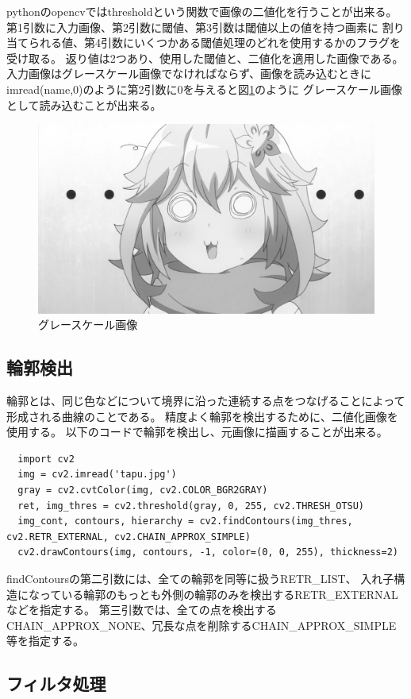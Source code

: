 \documentclass[dvipdfmx]{jsarticle}
\begin{document}
pythonのopencvではthresholdという関数で画像の二値化を行うことが出来る。
第1引数に入力画像、第2引数に閾値、第3引数は閾値以上の値を持つ画素に
割り当てられる値、第4引数にいくつかある閾値処理のどれを使用するかのフラグを受け取る。
返り値は2つあり、使用した閾値と、二値化を適用した画像である。
入力画像はグレースケール画像でなければならず、画像を読み込むときに
imread(name,0)のように第2引数に0を与えると図\ref{fig:grayscale}のように
グレースケール画像として読み込むことが出来る。
\begin{figure}[htbp]
  \centering
  \includegraphics[width=0.7\hsize]{../pic/grayscale.png}
  \caption{グレースケール画像}
  \label{fig:grayscale}
\end{figure}


\subsection{輪郭検出}

輪郭とは、同じ色などについて境界に沿った連続する点をつなげることによって
形成される曲線のことである。
精度よく輪郭を検出するために、二値化画像を使用する。
以下のコードで輪郭を検出し、元画像に描画することが出来る。
\begin{lstlisting}
  import cv2
  img = cv2.imread('tapu.jpg')
  gray = cv2.cvtColor(img, cv2.COLOR_BGR2GRAY)
  ret, img_thres = cv2.threshold(gray, 0, 255, cv2.THRESH_OTSU)
  img_cont, contours, hierarchy = cv2.findContours(img_thres, cv2.RETR_EXTERNAL, cv2.CHAIN_APPROX_SIMPLE)
  cv2.drawContours(img, contours, -1, color=(0, 0, 255), thickness=2)
\end{lstlisting}

findContoursの第二引数には、全ての輪郭を同等に扱うRETR\_LIST、
入れ子構造になっている輪郭のもっとも外側の輪郭のみを検出するRETR\_EXTERNALなどを指定する。
第三引数では、全ての点を検出するCHAIN\_APPROX\_NONE、冗長な点を削除するCHAIN\_APPROX\_SIMPLE等を指定する。


\subsection{フィルタ処理}
\end{document}
